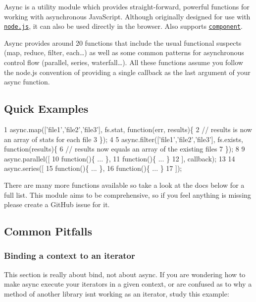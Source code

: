 Async is a utility module which provides straight-\/forward, powerful functions for working with asynchronous Java\+Script. Although originally designed for use with \href{http://nodejs.org}{\tt node.\+js}, it can also be used directly in the browser. Also supports \href{https://github.com/component/component}{\tt component}.

Async provides around 20 functions that include the usual \textquotesingle{}functional\textquotesingle{} suspects (map, reduce, filter, each…) as well as some common patterns for asynchronous control flow (parallel, series, waterfall…). All these functions assume you follow the node.\+js convention of providing a single callback as the last argument of your async function.

\subsection*{Quick Examples}


\begin{DoxyCode}
1 async.map(['file1','file2','file3'], fs.stat, function(err, results)\{
2     // results is now an array of stats for each file
3 \});
4 
5 async.filter(['file1','file2','file3'], fs.exists, function(results)\{
6     // results now equals an array of the existing files
7 \});
8 
9 async.parallel([
10     function()\{ ... \},
11     function()\{ ... \}
12 ], callback);
13 
14 async.series([
15     function()\{ ... \},
16     function()\{ ... \}
17 ]);
\end{DoxyCode}


There are many more functions available so take a look at the docs below for a full list. This module aims to be comprehensive, so if you feel anything is missing please create a Git\+Hub issue for it.

\subsection*{Common Pitfalls}

\subsubsection*{Binding a context to an iterator}

This section is really about bind, not about async. If you are wondering how to make async execute your iterators in a given context, or are confused as to why a method of another library isn\textquotesingle{}t working as an iterator, study this example\+:

